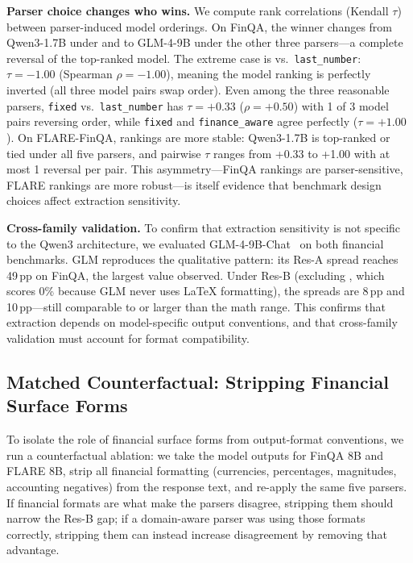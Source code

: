 \textbf{Parser choice changes who wins.} We compute rank correlations (Kendall $\tau$) between parser-induced model orderings. On FinQA, the winner changes from Qwen3-1.7B under \numparser{} and \boxedparser{} to GLM-4-9B under the other three parsers---a complete reversal of the top-ranked model. The extreme case is \numparser{} vs.\ \texttt{last\_number}: $\tau = -1.00$ (Spearman $\rho = -1.00$), meaning the model ranking is perfectly inverted (all three model pairs swap order). Even among the three reasonable parsers, \texttt{fixed} vs.\ \texttt{last\_number} has $\tau = +0.33$ ($\rho = +0.50$) with 1 of 3 model pairs reversing order, while \texttt{fixed} and \texttt{finance\_aware} agree perfectly ($\tau = +1.00$). On FLARE-FinQA, rankings are more stable: Qwen3-1.7B is top-ranked or tied under all five parsers, and pairwise $\tau$ ranges from +0.33 to +1.00 with at most 1 reversal per pair. This asymmetry---FinQA rankings are parser-sensitive, FLARE rankings are more robust---is itself evidence that benchmark design choices affect extraction sensitivity.

\textbf{Cross-family validation.} To confirm that extraction sensitivity is not specific to the Qwen3 architecture, we evaluated GLM-4-9B-Chat~\cite{glm2024} on both financial benchmarks. GLM reproduces the qualitative pattern: its Res-A spread reaches 49\,pp on FinQA, the largest value observed. Under Res-B (excluding \boxedparser{}, which scores 0\% because GLM never uses \LaTeX{} formatting), the spreads are 8\,pp and 10\,pp---still comparable to or larger than the math range. This confirms that \boxedparser{} extraction depends on model-specific output conventions, and that cross-family validation must account for format compatibility.

\subsection{Matched Counterfactual: Stripping Financial Surface Forms}
\label{sec:counterfactual}

To isolate the role of financial surface forms from output-format conventions, we run a counterfactual ablation: we take the model outputs for FinQA 8B and FLARE 8B, strip all financial formatting (currencies, percentages, magnitudes, accounting negatives) from the response text, and re-apply the same five parsers. If financial formats are what make the parsers disagree, stripping them should narrow the Res-B gap; if a domain-aware parser was using those formats correctly, stripping them can instead increase disagreement by removing that advantage.

